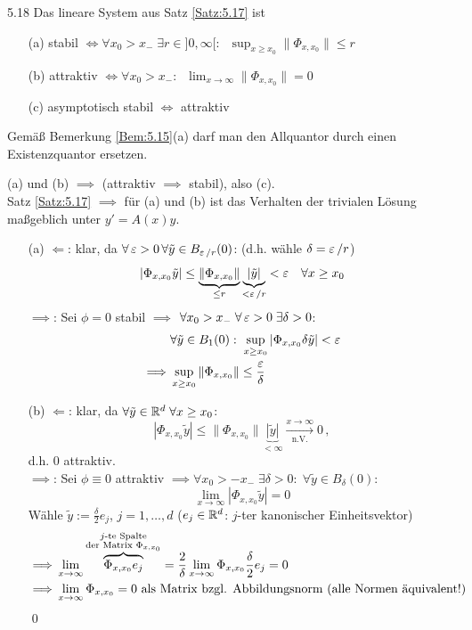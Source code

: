 \documentclass[a4paper]{article}
\begin{document}
\begin{Satz}{}{5.18}
Das lineare System aus Satz \ref{Satz:5.17} ist
\begin{itemize}
\item[(a)] stabil $\iff \forall x_0>x_-\;\exists r\in]0,\infty[:\;\;\sup_{x\ge x_0}\|\Phi_{x,x_0}\|\le r$
\item[(b)] attraktiv $\iff \forall x_0>x_-:\;\;\lim_{x\to\infty}\|\Phi_{x,x_0}\|=0$
\item[(c)] asymptotisch stabil $\iff$ attraktiv
\end{itemize}
Gemäß Bemerkung \ref{Bem:5.15}(a) darf man den Allquantor durch einen Existenzquantor ersetzen.
\end{Satz}

\begin{Beweis}
(a) und (b) $\implies$ (attraktiv $\implies$ stabil), also (c).\\
Satz \ref{Satz:5.17} $\implies$ für (a) und (b) ist das Verhalten der trivialen Lösung maßgeblich unter $y'=A(x)y$.
\begin{itemize}
\item[(a)] \glqq $\Longleftarrow$\grqq: klar, da $\forall \operatorname{\varepsilon}>0\,\forall \tilde{y}\in B_{\operatorname{\varepsilon}/r}(0)$: (d.h. wähle $\delta=\operatorname{\varepsilon}/r$)
\[|\Phi_{x,x_0}\tilde{y}|\le \underbrace{\|\Phi_{x,x_0}\|}_{\le r}\underbrace{|\tilde{y}|}_{<\operatorname{\varepsilon}/r}<\operatorname{\varepsilon}\;\;\;\forall x\ge x_0\]
\glqq $\implies$\grqq: Sei $\phi=0$ stabil $\implies$ $\forall x_0>x_-\;\forall \operatorname{\varepsilon}>0\;\exists\delta>0$:
\begin{align*}
&\forall \tilde{y}\in B_1(0):\;\sup_{x\ge x_0}|\Phi_{x,x_0}\delta\tilde{y}|<\operatorname{\varepsilon}\\
\implies & \sup_{x\ge x_0}\|\Phi_{x,x_0}\|\le \frac{\operatorname{\varepsilon} }{\delta}
\end{align*}
\item[(b)] \glqq $\Longleftarrow$\grqq: klar, da $\forall \tilde{y}\in\mathbb R^d\;\forall x\ge x_0$:
\[|\Phi_{x,x_0}\tilde{y}|\le\|\Phi_{x,x_0}\|\underbrace{|\tilde{y}|}_{<\infty}\xrightarrow[\text{n.V.}]{x\to\infty}0\,,\]
d.h. 0 attraktiv.\\
\glqq{}$\implies$\grqq: Sei $\phi\equiv 0$ attraktiv $\implies \forall x_0>-x_-\;\exists\delta>0:\;\forall \tilde{y}\in B_{\delta}(0)$:
\[\lim_{x\to\infty}|\Phi_{x,x_0}\tilde{y}|=0\]
Wähle $\tilde{y}:=\frac{\delta}{2}e_j$, $j=1,\ldots,d$ ($e_j\in\mathbb R^d$: $j$-ter kanonischer Einheitsvektor)
\begin{align*}
\implies&\lim_{x\to\infty}\overbrace{\Phi_{x,x_0}e_j}^{\substack{\text{$j$-te Spalte}\\\text{der Matrix $\Phi_{x,x_0}$}}}=\frac{2}{\delta}\lim_{x\to\infty}\Phi_{x,x_0}\frac{\delta}{2}e_j=0\\
\implies& \lim_{x\to\infty}\Phi_{x,x_0}=0\text{ als Matrix bzgl. Abbildungsnorm (alle Normen äquivalent!)}
\end{align*}\qed
\end{itemize}
\end{Beweis}
\end{document}
